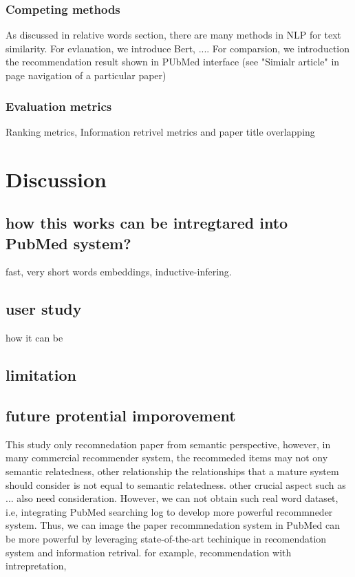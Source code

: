 \documentclass[11pt]{article}
\begin{document}
    \subsubsection{Competing methods}
    As discussed in relative words section, there are many methods in NLP for text similarity. For evlauation, we introduce Bert, .... For comparsion, we introduction the recommendation result shown in PUbMed interface (see "Simialr article" in page navigation of a particular paper)
    \subsubsection{Evaluation metrics}
    Ranking metrics, Information retrivel metrics and paper title overlapping



    \section{Discussion}

    \subsection{how this works can be intregtared into PubMed system?}
    fast, very short words embeddings, inductive-infering.

    \subsection{user study}
    how it can be

    \subsection{limitation}

    \subsection{future protential imporovement}

    This study only recomnedation paper from semantic perspective, however, in many commercial recommender system, the recommeded items may not ony semantic relatedness, other relationship
    the relationships that a mature system should consider is not equal to semantic relatedness. other crucial aspect such as ... also need consideration.
    However, we can not obtain such real word dataset, i.e, integrating PubMed searching log to develop more powerful recommneder system.
    Thus, we can image the paper recommnedation system in PubMed can be more powerful by leveraging state-of-the-art techinique in recomendation system and information retrival.
    for example, recommendation with intrepretation,
\end{document}
